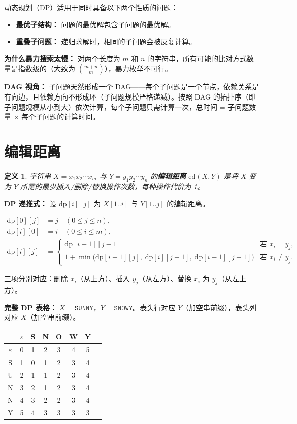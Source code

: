 \documentclass[UTF8,openany,12pt]{ctexbook}
\newtheorem{definition}{定义}[chapter]
\theoremstyle{remark}
\begin{document}
动态规划（DP）适用于同时具备以下两个性质的问题：
\begin{itemize}
  \item \textbf{最优子结构：} 问题的最优解包含子问题的最优解。
  \item \textbf{重叠子问题：} 递归求解时，相同的子问题会被反复计算。
\end{itemize}

\textbf{为什么暴力搜索太慢：} 对两个长度为 $m$ 和 $n$ 的字符串，所有可能的比对方式数量是指数级的（大致为 $\binom{m+n}{m}$），暴力枚举不可行。

\textbf{DAG 视角：} 子问题天然形成一个 DAG——每个子问题是一个节点，依赖关系是有向边，且依赖方向不形成环（子问题规模严格递减）。按照 DAG 的拓扑序（即子问题规模从小到大）依次计算，每个子问题只需计算一次，总时间 = 子问题数量 $\times$ 每个子问题的计算时间。

\section{编辑距离}

\begin{definition}
字符串 $X = x_1 x_2 \cdots x_m$ 与 $Y = y_1 y_2 \cdots y_n$ 的\textbf{编辑距离} $\mathrm{ed}(X, Y)$ 是将 $X$ 变为 $Y$ 所需的最少插入/删除/替换操作次数，每种操作代价为 1。
\end{definition}

\textbf{DP 递推式：} 设 $\mathrm{dp}[i][j]$ 为 $X[1..i]$ 与 $Y[1..j]$ 的编辑距离。

\begin{align*}
  \mathrm{dp}[0][j] &= j \quad (0 \leq j \leq n), \\
  \mathrm{dp}[i][0] &= i \quad (0 \leq i \leq m), \\
  \mathrm{dp}[i][j] &= \begin{cases}
    \mathrm{dp}[i-1][j-1] & \text{若 } x_i = y_j,\\
    1 + \min\bigl(\mathrm{dp}[i-1][j],\; \mathrm{dp}[i][j-1],\; \mathrm{dp}[i-1][j-1]\bigr) & \text{若 } x_i \neq y_j.
  \end{cases}
\end{align*}

三项分别对应：删除 $x_i$（从上方）、插入 $y_j$（从左方）、替换 $x_i$ 为 $y_j$（从左上方）。

\textbf{完整 DP 表格：} $X = \texttt{SUNNY}$，$Y = \texttt{SNOWY}$。表头行对应 $Y$（加空串前缀），表头列对应 $X$（加空串前缀）。

\begin{center}
\begin{tabular}{@{}c|ccccccc@{}}
\toprule
       & $\varepsilon$ & S & N & O & W & Y \\
\midrule
$\varepsilon$ & 0 & 1 & 2 & 3 & 4 & 5 \\
S      & 1 & 0 & 1 & 2 & 3 & 4 \\
U      & 2 & 1 & 1 & 2 & 3 & 4 \\
N      & 3 & 2 & 1 & 2 & 3 & 4 \\
N      & 4 & 3 & 2 & 2 & 3 & 4 \\
Y      & 5 & 4 & 3 & 3 & 3 & 3 \\
\bottomrule
\end{tabular}
\end{center}
\end{document}
